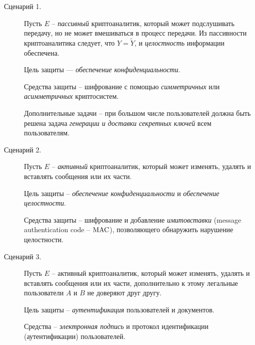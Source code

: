 \begin{description}
    \item[Сценарий 1.] Пусть $E$ -- \emph{пассивный} криптоаналитик, который может подслушивать передачу, но не может вмешиваться в процесс передачи. Из пассивности криптоаналитика следует, что $Y = \widetilde{Y}$, и \emph{целостность} информации обеспечена.

Цель защиты --- \emph{обеспечение конфиденциальности}.

Средства защиты -- шифрование с помощью \emph{симметричных} или \emph{асимметричных } криптосистем.

Дополнительные задачи -- при большом числе пользователей должна быть решена задача \emph{генерации и доставки секретных ключей} всем пользователям.

    \item[Сценарий 2.] Пусть $E$ -- \emph{активный} криптоаналитик, который может изменять, удалять и вставлять сообщения или их части.

    Цель защиты -- \emph{обеспечение конфиденциальности} и  \emph{обеспечение целостности}.

Средства защиты -- шифрование и добавление \emph{имитовставки} (message authentication code -- $\textrm{MAC}$), позволяющего обнаружить нарушение целостности.

    \item[Сценарий 3.] Пусть $E$ -- активный криптоаналитик, который может изменять, удалять и вставлять сообщения или их части, дополнительно к этому легальные пользователи $A$ и $B$ не доверяют друг другу.

Цель защиты -- \emph{аутентификация} пользователей и документов.

Средства -- \emph{электронная подпись} и протокол идентификации (аутентификации) пользователей.
\end{description}

%
